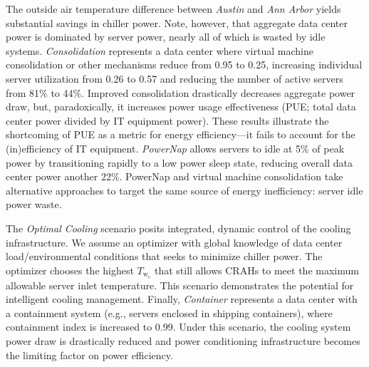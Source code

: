 The outside air temperature difference between \emph{Austin} and \emph{Ann Arbor} yields substantial savings in chiller power.  Note, however, that aggregate data center power is dominated by server power, nearly all of which is wasted by idle systems.  \emph{Consolidation} represents a data center where virtual machine consolidation or other mechanisms reduce \el  from 0.95 to 0.25, increasing individual server utilization from 0.26 to 0.57 and reducing the number of active servers from 81\% to 44\%.
Improved consolidation drastically decreases aggregate power draw, but, paradoxically, it increases power usage effectiveness (PUE; total data center power divided by IT equipment power).  These results illustrate the shortcoming of PUE as a metric for energy efficiency---it fails to account for the (in)effi\-ciency of IT equipment.  \emph{PowerNap} \cite{Meisner09} allows servers to idle at 5\% of peak power by transitioning rapidly to a low power sleep state, reducing overall data center power another 22\%.  PowerNap and virtual machine consolidation take alternative approaches to target the same source of energy inefficiency: server idle power waste.

The \emph{Optimal Cooling} scenario posits integrated, dynamic control of the cooling infrastructure.
We assume an optimizer with global knowledge of data center load/environmental conditions that seeks to minimize chiller power.  The optimizer chooses the highest $T_{\mathrm{w}_\mathrm{c}}$ that still allows CRAHs to meet the maximum allowable server inlet temperature. 
This scenario demonstrates the potential for intelligent cooling management.  Finally, \emph{Container} represents a data center with a containment system (e.g., servers enclosed in shipping containers), where containment index is increased to 0.99.  Under this scenario, the cooling system power draw is drastically reduced and power conditioning infrastructure becomes the limiting factor on power efficiency.


